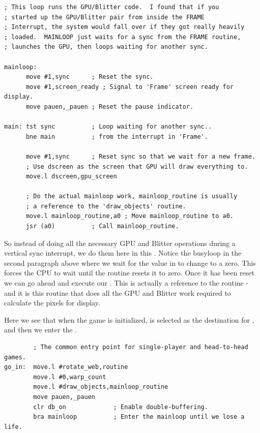 \begin{lstlisting}[escapechar=\%]
; This loop runs the GPU/Blitter code.  I found that if you
; started up the GPU/Blitter pair from inside the FRAME
; Interrupt, the system would fall over if they got really heavily
; loaded.  MAINLOOP just waits for a sync from the FRAME routine,
; launches the GPU, then loops waiting for another sync.

mainloop:
      move #1,sync      ; Reset the sync.
      move #1,screen_ready ; Signal to 'Frame' screen ready for display.
      move pauen,_pauen ; Reset the pause indicator.
  
main: tst sync          ; Loop waiting for another sync..
      bne main          ; from the interrupt in 'Frame'.
  
      move #1,sync      ; Reset sync so that we wait for a new frame.
      ; Use dscreen as the screen that GPU will draw everything to.
      move.l dscreen,gpu_screen  
  
      ; Do the actual mainloop work, mainloop_routine is usually 
      ; a reference to the 'draw_objects' routine.
      move.l mainloop_routine,a0 ; Move mainloop_routine to a0. 
      jsr (a0)          ; Call mainloop_routine. 
\end{lstlisting}

So instead of doing all the necessary GPU and Blitter operations during a vertical sync interrupt, we do them
here in this . Notice the busyloop in the second paragraph above where we wait for the value in 
to change to a zero. This forces the CPU to wait until the  routine resets it to zero. Once it has
been reset we can go ahead and execute our . This is actually a reference to the 
 routine - and it is this routine that does all the GPU and Blitter work required to calculate
the pixels for display.

Here we see that when the game is initialized,  is selected as the destination for
, and then we enter the .
\begin{lstlisting}
        ; The common entry point for single-player and head-to-head games.
go_in:  move.l #rotate_web,routine
        move.l #0,warp_count
        move.l #draw_objects,mainloop_routine
        move pauen,_pauen
        clr db_on             ; Enable double-buffering.
        bra mainloop          ; Enter the mainloop until we lose a life.
\end{lstlisting}

